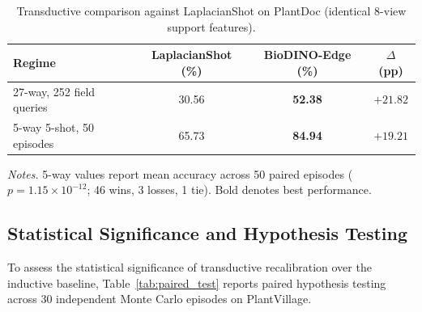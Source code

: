 \begin{table}[htbp]
\caption{Transductive comparison against LaplacianShot on PlantDoc (identical 8-view support features).}
\label{tab:plantdoc_laplacian}
\centering

\footnotesize
\setlength{\tabcolsep}{4pt}
\begin{tabular*}{\columnwidth}{@{\extracolsep{\fill}}lccc}
\toprule
\textbf{Regime} & \textbf{LaplacianShot (\%)} & \textbf{BioDINO-Edge (\%)} & \textbf{$\Delta$ (pp)} \\
\midrule
27-way, 252 field queries & 30.56 & \textbf{52.38} & $+21.82$ \\
5-way 5-shot, 50 episodes & 65.73 & \textbf{84.94} & $+19.21$ \\
\bottomrule
\end{tabular*}

\vspace{3pt}
\begin{minipage}{\columnwidth}
\footnotesize
\textit{Notes.} 5-way values report mean accuracy across 50 paired episodes ($p = 1.15 \times 10^{-12}$; 46 wins, 3 losses, 1 tie). Bold denotes best performance.
\end{minipage}
\end{table}

\subsection{Statistical Significance and Hypothesis Testing}
\label{sec:significance}
\label{sec:transductive_validation}

To assess the statistical significance of transductive recalibration over the inductive baseline, Table~\ref{tab:paired_test} reports paired hypothesis testing across 30 independent Monte Carlo episodes on PlantVillage.

